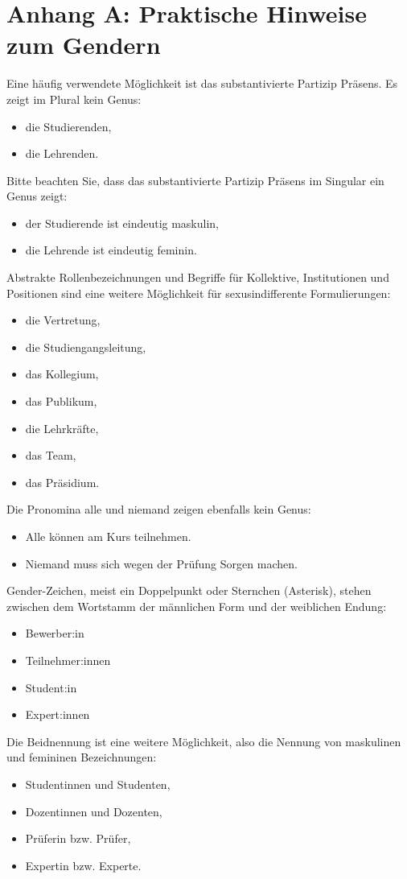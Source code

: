 \chapter*{Anhang A: Praktische Hinweise zum Gendern}
\label{app:gendern}

Eine häufig verwendete Möglichkeit ist das substantivierte Partizip Präsens. Es zeigt im Plural kein Genus:
\begin{itemize}
\item die Studierenden,
\item die Lehrenden.
\end{itemize}

Bitte beachten Sie, dass das substantivierte Partizip Präsens im Singular ein Genus zeigt:
\begin{itemize}
\item der Studierende ist eindeutig maskulin,
\item die Lehrende ist eindeutig feminin.
\end{itemize}

Abstrakte Rollenbezeichnungen und Begriffe für Kollektive, Institutionen und Positionen sind eine weitere Möglichkeit für sexusindifferente Formulierungen:
\begin{itemize}
\item die Vertretung,
\item die Studiengangsleitung,
\item das Kollegium,
\item das Publikum,
\item die Lehrkräfte,
\item das Team,
\item das Präsidium.
\end{itemize}

Die Pronomina alle und niemand zeigen ebenfalls kein Genus:
\begin{itemize}
\item Alle können am Kurs teilnehmen.
\item Niemand muss sich wegen der Prüfung Sorgen machen.
\end{itemize}

Gender-Zeichen, meist ein Doppelpunkt oder Sternchen (Asterisk), stehen zwischen dem Wortstamm der männlichen Form und der weiblichen Endung:
\begin{itemize}
\item Bewerber:in
\item Teilnehmer:innen
\item Student:in
\item Expert:innen
\end{itemize}

Die Beidnennung ist eine weitere Möglichkeit, also die Nennung von maskulinen und femininen Bezeichnungen:
\begin{itemize}
\item Studentinnen und Studenten,
\item Dozentinnen und Dozenten,
\item Prüferin bzw. Prüfer,
\item Expertin bzw. Experte.
\end{itemize}